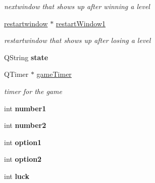 \begin{DoxyCompactItemize}
\begin{DoxyCompactList}\small\item\em nextwindow that shows up after winning a level \end{DoxyCompactList}\item 
\hypertarget{classgamemanager5_a99468c8d4f4f2929fddeb6e394b86e14}{\hyperlink{classrestartwindow}{restartwindow} $\ast$ \hyperlink{classgamemanager5_a99468c8d4f4f2929fddeb6e394b86e14}{restart\-Window1}}\label{classgamemanager5_a99468c8d4f4f2929fddeb6e394b86e14}

\begin{DoxyCompactList}\small\item\em restartwindow that shows up after losing a level \end{DoxyCompactList}\item 
\hypertarget{classgamemanager5_a5c5bdb78d8d439ac8265cedfc0ec34b9}{\-Q\-String {\bfseries state}}\label{classgamemanager5_a5c5bdb78d8d439ac8265cedfc0ec34b9}

\item 
\hypertarget{classgamemanager5_a82e9be3ef50c14c980a4f35445c932a4}{\-Q\-Timer $\ast$ \hyperlink{classgamemanager5_a82e9be3ef50c14c980a4f35445c932a4}{game\-Timer}}\label{classgamemanager5_a82e9be3ef50c14c980a4f35445c932a4}

\begin{DoxyCompactList}\small\item\em timer for the game \end{DoxyCompactList}\item 
\hypertarget{classgamemanager5_a87ed32b2b208bcde57c938ff58462693}{int {\bfseries number1}}\label{classgamemanager5_a87ed32b2b208bcde57c938ff58462693}

\item 
\hypertarget{classgamemanager5_a5461c0319ea22b7cdc0c33faac31fb67}{int {\bfseries number2}}\label{classgamemanager5_a5461c0319ea22b7cdc0c33faac31fb67}

\item 
\hypertarget{classgamemanager5_ae95847a38e3d5239ce1d747263ae5b22}{int {\bfseries option1}}\label{classgamemanager5_ae95847a38e3d5239ce1d747263ae5b22}

\item 
\hypertarget{classgamemanager5_ac2e81b5964fb342453063e9852209fa9}{int {\bfseries option2}}\label{classgamemanager5_ac2e81b5964fb342453063e9852209fa9}

\item 
\hypertarget{classgamemanager5_aaa34e21cc277279b3b53338e1fef77af}{int {\bfseries luck}}\label{classgamemanager5_aaa34e21cc277279b3b53338e1fef77af}


\end{DoxyCompactItemize}
